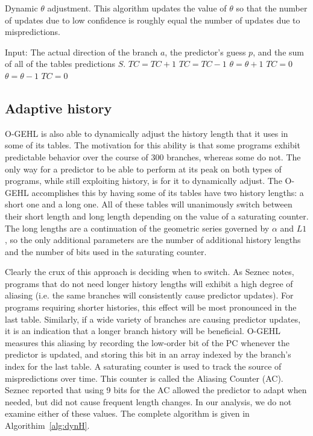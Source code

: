 \begin{algorithm}[h]
  \caption{Dynamic $\theta$ adjustment.  This algorithm updates the value of $\theta$ so that the number of updates due to low confidence is roughly equal the number of updates due to mispredictions.}
  \begin{algorithmic}[1]
    \label{alg:dynT}
    \STATE Input: The actual direction of the branch $a$, the predictor's guess $p$, and the sum of all of the tables predictions $S$.
   \STATE
      \STATE $TC = TC + 1$
      \STATE $TC = TC - 1$
    \ENDIF
      \STATE $\theta=\theta+1$
      \STATE $TC=0$
      \STATE $\theta=\theta-1$
      \STATE $TC=0$
    \ENDIF
  \end{algorithmic}
\end{algorithm}


\subsection{Adaptive history}
\label{sec:adaptH}
O-GEHL is also able to dynamically adjust the history length that it uses in some of its tables.  The motivation for this ability is that some programs exhibit predictable behavior over the course of 300 branches, whereas some do not.  The only way for a predictor to be able to perform at its peak on both types of programs, while still exploiting history, is for it to dynamically adjust.  The O-GEHL accomplishes this by having some of its tables have two history lengths: a short one and a long one.  All of these tables will unanimously switch between their short length and long length depending on the value of a saturating counter. The long lengths are a continuation of the geometric series governed by $\alpha$ and $L1$, so the only additional parameters are the number of additional history lengths and the number of bits used in the saturating counter.

Clearly the crux of this approach is deciding when to switch.  As Seznec notes, programs that do not need longer history lengths will exhibit a high degree of aliasing (i.e. the same branches will consistently cause predictor updates).\cite{seznec2005analysis}\cite{ogehl} For programs requiring shorter histories, this effect will be most pronounced in the last table.  Similarly, if a wide variety of branches are causing predictor updates, it is an indication that a longer branch history will be beneficial.  O-GEHL measures this aliasing by recording the low-order bit of the PC whenever the predictor is updated, and storing this bit in an array indexed by the branch's index for the last table.  A saturating counter is used to track the source of mispredictions over time.  This counter is called the Aliasing Counter (AC).  Seznec reported that using 9 bits for the AC allowed the predictor to adapt when needed, but did not cause frequent length changes.  In our analysis, we do not examine either of these values.  The complete algorithm is given in Algorithim~\ref{alg:dynH}.

